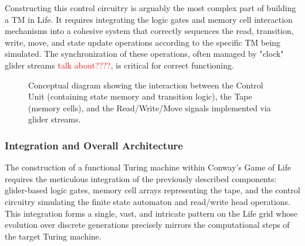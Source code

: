 \documentclass{article}
\theoremstyle{definition}
\theoremstyle{plain}
\theoremstyle{plain}
\begin{document}
Constructing this control circuitry is arguably the most complex part of building a TM in Life. It requires integrating the logic gates and memory cell interaction mechanisms into a cohesive system that correctly sequences the read, transition, write, move, and state update operations according to the specific TM being simulated. The synchronization of these operations, often managed by "clock" glider streams \textcolor{red}{talk about????}, is critical for correct functioning.

\begin{figure}[H]
  \centering
  \caption{Conceptual diagram showing the interaction between the Control Unit (containing state memory and transition logic), the Tape (memory cells), and the Read/Write/Move signals implemented via glider streams.}
  \label{fig:tm-control}
\end{figure}

\subsubsection{Integration and Overall Architecture}

The construction of a functional Turing machine within Conway's Game of Life requires the meticulous integration of the previously described components: glider-based logic gates, memory cell arrays representing the tape, and the control circuitry simulating the finite state automaton and read/write head operations. This integration forms a single, vast, and intricate pattern on the Life grid whose evolution over discrete generations precisely mirrors the computational steps of the target Turing machine.
\end{document}
